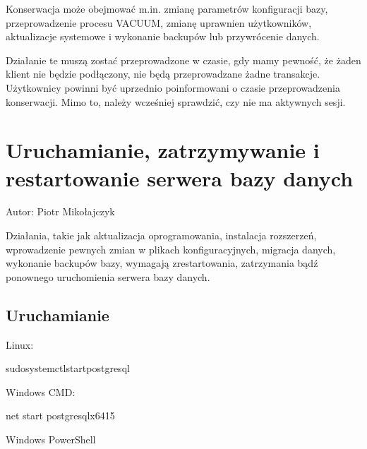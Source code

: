 \documentclass[a4paper,11pt,polish]{sphinxmanual}
\begin{document}
\sphinxAtStartPar
Konserwacja może obejmować m.in. zmianę parametrów konfiguracji bazy, przeprowadzenie procesu VACUUM, zmianę uprawnien użytkowników, aktualizacje systemowe i wykonanie backupów lub przywrócenie danych.

\sphinxAtStartPar
Działanie te muszą zostać przeprowadzone w czasie, gdy mamy pewność, że żaden klient nie będzie podłączony, nie będą przeprowadzane żadne transakcje. Użytkownicy powinni być uprzednio poinformowani o czasie przeprowadzenia konserwacji. Mimo to, należy wcześniej sprawdzić, czy nie ma aktywnych sesji.


\section{Uruchamianie, zatrzymywanie i restartowanie serwera bazy danych}
\label{\detokenize{Kontrola_i_konserwacja/kontrola_i_konserwacja:uruchamianie-zatrzymywanie-i-restartowanie-serwera-bazy-danych}}
\sphinxAtStartPar
Autor: Piotr Mikołajczyk

\sphinxAtStartPar
Działania, takie jak aktualizacja oprogramowania, instalacja rozszerzeń, wprowadzenie pewnych zmian w plikach konfiguracyjnych, migracja danych, wykonanie backupów bazy, wymagają zrestartowania, zatrzymania bądź ponownego uruchomienia serwera bazy danych.


\subsection{Uruchamianie}
\label{\detokenize{Kontrola_i_konserwacja/kontrola_i_konserwacja:uruchamianie}}
\sphinxAtStartPar
Linux:

\begin{sphinxVerbatim}[commandchars=\\\{\}]
sudosystemctlstartpostgresql
\end{sphinxVerbatim}

\sphinxAtStartPar
Windows CMD:

\begin{sphinxVerbatim}[commandchars=\\\{\}]
net start postgresql\PYGZhy{}x64\PYGZhy{}15
\end{sphinxVerbatim}

\sphinxAtStartPar
Windows PowerShell

\begin{sphinxVerbatim}[commandchars=\\\{\}]
  
\end{sphinxVerbatim}
\end{document}
